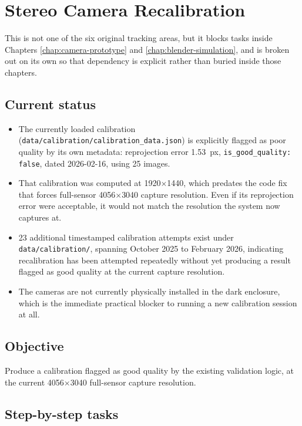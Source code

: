 \chapter{Stereo Camera Recalibration}
\label{chap:recalibration}

This is not one of the six original tracking areas, but it blocks tasks inside Chapters \ref{chap:camera-prototype} and \ref{chap:blender-simulation}, and is broken out on its own so that dependency is explicit rather than buried inside those chapters.

\section{Current status}

\begin{itemize}
    \item The currently loaded calibration (\texttt{data/calibration/calibration\_data.json}) is explicitly flagged as poor quality by its own metadata: reprojection error 1.53~px, \texttt{is\_good\_quality: false}, dated 2026-02-16, using 25 images.
    \item That calibration was computed at 1920$\times$1440, which predates the code fix that forces full-sensor 4056$\times$3040 capture resolution. Even if its reprojection error were acceptable, it would not match the resolution the system now captures at.
    \item 23 additional timestamped calibration attempts exist under \texttt{data/calibration/}, spanning October 2025 to February 2026, indicating recalibration has been attempted repeatedly without yet producing a result flagged as good quality at the current capture resolution.
    \item The cameras are not currently physically installed in the dark enclosure, which is the immediate practical blocker to running a new calibration session at all.
\end{itemize}

\section{Objective}

Produce a calibration flagged as good quality by the existing validation logic, at the current 4056$\times$3040 full-sensor capture resolution.

\section{Step-by-step tasks}

